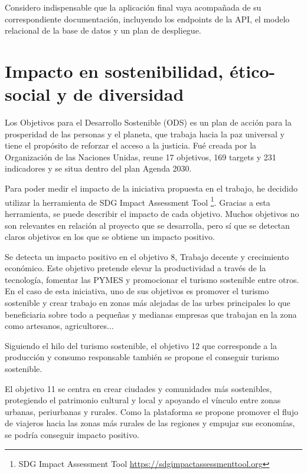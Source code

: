 Considero indispensable que la aplicación final vaya acompañada de su correspondiente documentación, incluyendo los endpoints de la API, el modelo relacional de la base de datos y un plan de despliegue.


\section{Impacto en sostenibilidad, ético-social y de diversidad}\label{sec:impacto}
Los Objetivos para el Desarrollo Sostenible (ODS) es un plan de acción para la prosperidad de las personas y el planeta, que trabaja hacia la paz universal y tiene el propósito de reforzar el acceso a la justicia. Fué creada por la Organización de las Naciones Unidas, reune 17 objetivos, 169 targets y 231 indicadores y se situa dentro del plan Agenda 2030.

Para poder medir el impacto de la iniciativa propuesta en el trabajo, he decidido utilizar la herramienta de SDG Impact Assessment Tool \footnote{SDG Impact Assessment Tool \url{https://sdgimpactassessmenttool.org}}. Gracias a esta herramienta, se puede describir el impacto de cada objetivo. Muchos objetivos no son relevantes en relación al proyecto que se desarrolla, pero sí que se detectan claros objetivos en los que se obtiene un impacto positivo.

Se detecta un impacto positivo en el objetivo 8, Trabajo decente y crecimiento económico. Este objetivo pretende elevar la productividad a través de la tecnología, fomentar las PYMES y promocionar el turismo sostenible entre otros. En el caso de esta iniciativa, uno de sus objetivos es promover el turismo sostenible y crear trabajo en zonas más alejadas de las urbes principales lo que beneficiaria sobre todo a pequeñas y medianas empresas que trabajan en la zona como artesanos, agricultores...

Siguiendo el hilo del turismo sostenible, el objetivo 12 que corresponde a la producción y consumo responsable también se propone el conseguir turismo sostenible.

El objetivo 11 se centra en crear ciudades y comunidades más sostenibles, protegiendo el patrimonio cultural y local y apoyando el vínculo entre zonas urbanas, periurbanas y rurales. Como la plataforma se propone promover el flujo de viajeros hacia las zonas más rurales de las regiones y empujar sus economías, se podría conseguir impacto positivo.

